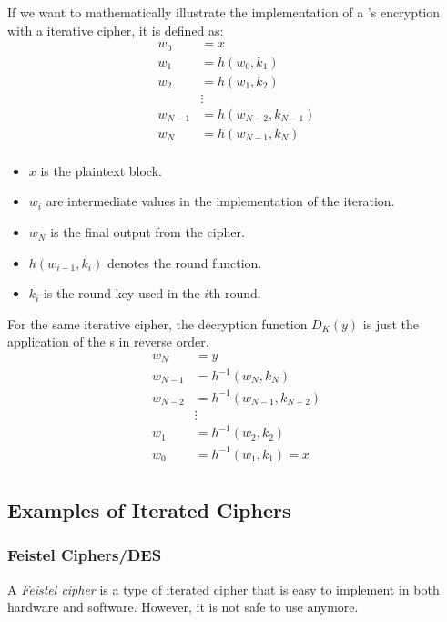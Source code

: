 If we want to mathematically illustrate the implementation of a 's encryption with a iterative cipher, it is defined as:
\begin{align*}
  w_{0} &= x \\
  w_{1} &= h(w_{0}, k_{1}) \\
  w_{2} &= h(w_{1}, k_{2}) \\
        &\vdots \\
  w_{N-1} &= h(w_{N-2}, k_{N-1}) \\
  w_{N} &= h(w_{N-1}, k_{N}) \\
\end{align*}
\begin{itemize}[noitemsep]
\item $x$ is the plaintext block.
\item $w_{i}$ are intermediate values in the implementation of the iteration.
\item $w_{N}$ is the final output from the cipher.
\item $h(w_{i-1}, k_{i})$ denotes the round function.
\item $k_{i}$ is the round key used in the $i$th round.
\end{itemize}

For the same iterative cipher, the decryption function $D_{K}(y)$ is just the application of the s in reverse order.
\begin{align*}
  w_{N} &= y \\
  w_{N-1} &= h^{-1}(w_{N}, k_{N}) \\
  w_{N-2} &= h^{-1}(w_{N-1}, k_{N-2}) \\
        &\vdots \\
  w_{1} &= h^{-1}(w_{2}, k_{2}) \\
  w_{0} &= h^{-1}(w_{1}, k_{1}) = x \\
\end{align*}

\subsection{Examples of Iterated Ciphers}\label{subsec:Examples_Iterated_Ciphers}
\subsubsection{Feistel Ciphers/DES}\label{subsubsec:Feistel_Cipher_DES}
\begin{definition}\label{def:Feistel_Cipher}
  A \emph{Feistel cipher} is a type of iterated cipher that is easy to implement in both hardware and software.
  However, it is not safe to use anymore.

\end{definition}

